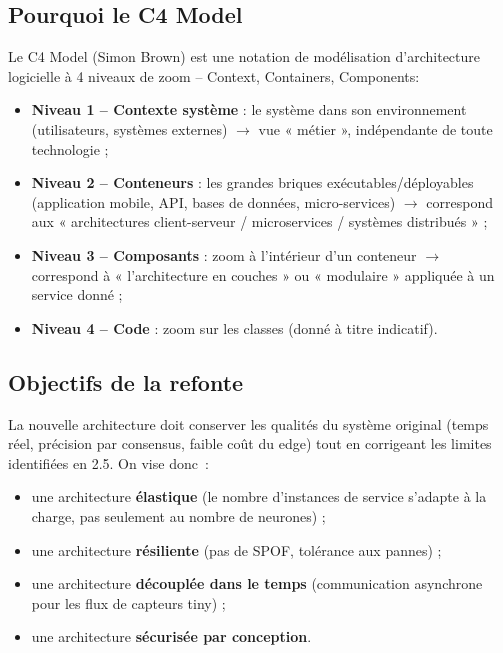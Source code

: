 \documentclass[11pt,a4paper]{article}
\begin{document}
\subsection{Pourquoi le C4 Model}
Le C4 Model (Simon Brown) est une notation de modélisation d'architecture logicielle à 4 niveaux de zoom -- Context, Containers, Components:
\begin{itemize}
\item \textbf{Niveau 1 -- Contexte système} : le système dans son environnement (utilisateurs, systèmes externes) $\rightarrow$ vue « métier », indépendante de toute technologie ;
\item \textbf{Niveau 2 -- Conteneurs} : les grandes briques exécutables/déployables (application mobile, API, bases de données, micro-services) $\rightarrow$ correspond aux « architectures client-serveur / microservices / systèmes distribués » ;
\item \textbf{Niveau 3 -- Composants} : zoom à l'intérieur d'un conteneur $\rightarrow$ correspond à « l'architecture en couches » ou « modulaire » appliquée à un service donné ;
\item \textbf{Niveau 4 -- Code} : zoom sur les classes (donné à titre indicatif).
\end{itemize}

\subsection{Objectifs de la refonte}
La nouvelle architecture doit conserver les qualités du système original (temps réel, précision par consensus, faible coût du edge) tout en corrigeant les limites identifiées en 2.5. On vise donc~:
\begin{itemize}
\item une architecture \textbf{élastique} (le nombre d'instances de service s'adapte à la charge, pas seulement au nombre de neurones) ;
\item une architecture \textbf{résiliente} (pas de SPOF, tolérance aux pannes) ;
\item une architecture \textbf{découplée dans le temps} (communication asynchrone pour les flux de capteurs tiny) ;
\item une architecture \textbf{sécurisée par conception}.
\end{itemize}
\end{document}
